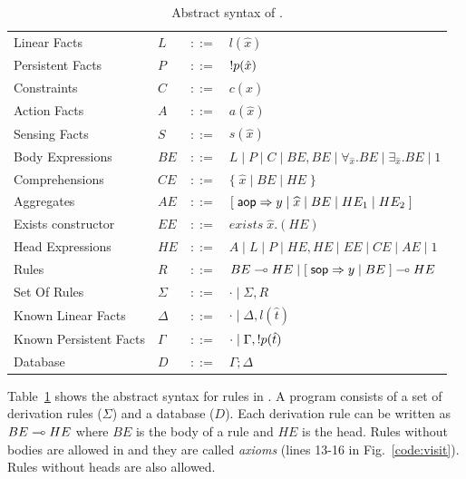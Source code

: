 \begin{table}[h]
   \centering
\begin{tabular}{ l l c l }
  Linear Facts & $L$ & $::=$ & $l(\hat{x})$\\
  Persistent Facts & $P$ & $::=$ & ${!} p(\hat{x})$\\
  Constraints & $C$ & $::=$ & $c(\hat{x})$ \\
  Action Facts & $A$ & $::=$ & $a(\hat{x})$\\
  Sensing Facts & $S$ & $::=$ & $s(\hat{x})$\\
  Body Expressions & $BE$ & $::=$ & $L \; | \; P \; | \; C \; | \; BE, BE \; | \; \forall_{\widehat{x}}. BE \; | \; \exists_{\widehat{x}}. BE \; | \; 1$\\
  Comprehensions & $CE$ & $::=$ & $\{ \; \widehat{x} \; | \; BE \; | \; HE \; \}$ \\
  Aggregates & $AE$ & $::=$ & $[\;\mathsf{aop} \Rightarrow y \; | \; \widehat{x} \; | \; BE \; | \; HE_1 \; | \; HE_2 \;]$ \\
  Exists constructor & $EE$ & $::=$ & $exists \; \widehat{x}. (HE)$ \\
  Head Expressions & $HE$ & $::=$ & $A \; | \; L \; | \; P \; | \; HE, HE \; | \; EE \; | \; CE \; | \; AE \; | \; 1$\\
  Rules & $R$ & $::=$ & $BE \multimap HE \; | \; [\; \mathsf{sop} \Rightarrow y \; | \; BE \;] \multimap HE$ \\
  Set Of Rules & $\Sigma$ & $::=$ & $\cdot \; | \; \Sigma, R$\\
  Known Linear Facts & $\Delta$ & $::=$ & $\cdot \; | \; \Delta, l(\hat{t})$ \\
  Known Persistent Facts & $\Gamma$ & $::=$ & $\cdot \; | \; \Gamma, {!} p(\hat{t})$ \\
  Database & $D$ & $::=$ & $\Gamma; \Delta$ \\
\end{tabular}
\caption{Abstract syntax of \lang.}\label{tbl:ast}
\end{table}

\renewcommand{\arraystretch}{1.0}

Table~\ref{tbl:ast} shows the abstract syntax for rules in \lang.
A \lang program consists of a set of derivation rules ($\Sigma$) and a database ($D$).
Each derivation rule can be written as $BE \multimap HE$ where $BE$ is the body of a rule and
$HE$ is the head. Rules without bodies are allowed in \lang and they are called \textit{axioms} (lines 13-16 in Fig.~\ref{code:visit}). Rules without heads are also allowed.

